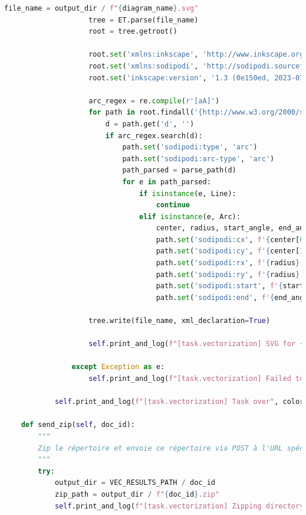 \begin{lstlisting}[language=python, frame=single, breaklines=true, caption={Classe \texttt{ComputeVectorization}.}]
                    file_name = output_dir / f"{diagram_name}.svg"
                    tree = ET.parse(file_name)
                    root = tree.getroot()

                    root.set('xmlns:inkscape', 'http://www.inkscape.org/namespaces/inkscape')
                    root.set('xmlns:sodipodi', 'http://sodipodi.sourceforge.net/DTD/sodipodi-0.dtd')
                    root.set('inkscape:version', '1.3 (0e150ed, 2023-07-21)')

                    arc_regex = re.compile(r'[aA]')
                    for path in root.findall('{http://www.w3.org/2000/svg}path'):
                        d = path.get('d', '')
                        if arc_regex.search(d):
                            path.set('sodipodi:type', 'arc')
                            path.set('sodipodi:arc-type', 'arc')
                            path_parsed = parse_path(d)
                            for e in path_parsed:
                                if isinstance(e, Line):
                                    continue
                                elif isinstance(e, Arc):
                                    center, radius, start_angle, end_angle, p0, p1 = get_arc_param([e])
                                    path.set('sodipodi:cx', f'{center[0]}')
                                    path.set('sodipodi:cy', f'{center[1]}')
                                    path.set('sodipodi:rx', f'{radius}')
                                    path.set('sodipodi:ry', f'{radius}')
                                    path.set('sodipodi:start', f'{start_angle}')
                                    path.set('sodipodi:end', f'{end_angle}')

                    tree.write(file_name, xml_declaration=True)

                    self.print_and_log(f"[task.vectorization] SVG for {image_path} drawn", color="yellow")

                except Exception as e:
                    self.print_and_log(f"[task.vectorization] Failed to process {image_path}", e)

            self.print_and_log(f"[task.vectorization] Task over", color="yellow")

    def send_zip(self, doc_id):
        """
        Zip le répertoire et envoie ce répertoire via POST à l'URL spécifiée.
        """
        try:
            output_dir = VEC_RESULTS_PATH / doc_id
            zip_path = output_dir / f"{doc_id}.zip"
            self.print_and_log(f"[task.vectorization] Zipping directory {output_dir}", color="blue")


\end{lstlisting}
